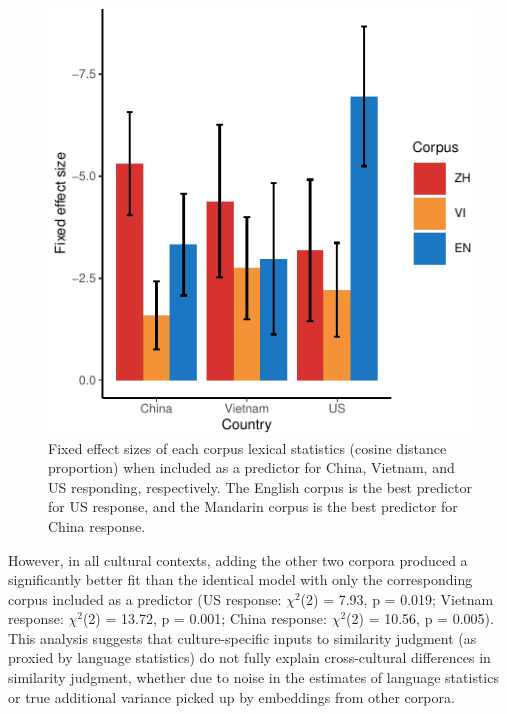 \documentclass[10pt, letterpaper]{article}
\newenvironment{CodeChunk}{}{}
\begin{document}
\begin{CodeChunk}
\begin{figure}[tb]

{\centering \includegraphics{figs/coeffs_cos-1} 

}

\caption[Fixed effect sizes of each corpus lexical statistics (cosine distance proportion) when included as a predictor for China, Vietnam, and US responding, respectively]{Fixed effect sizes of each corpus lexical statistics (cosine distance proportion) when included as a predictor for China, Vietnam, and US responding, respectively. The English corpus is the best predictor for US response, and the Mandarin corpus is the best predictor for China response.}\label{fig:coeffs_cos}
\end{figure}
\end{CodeChunk}

However, in all cultural contexts, adding the other two corpora produced
a significantly better fit than the identical model with only the
corresponding corpus included as a predictor (US response: \(\chi^2\)(2)
= 7.93, p = 0.019; Vietnam response: \(\chi^2\)(2) = 13.72, p = 0.001;
China response: \(\chi^2\)(2) = 10.56, p = 0.005). This analysis
suggests that culture-specific inputs to similarity judgment (as proxied
by language statistics) do not fully explain cross-cultural differences
in similarity judgment, whether due to noise in the estimates of
language statistics or true additional variance picked up by embeddings
from other corpora.
\end{document}
